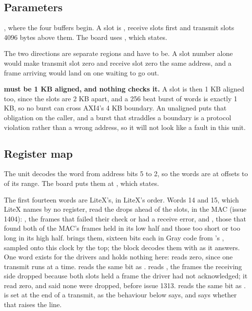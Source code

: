 \subsection*{Parameters}

, where the four buffers begin. A slot is , receive slots first and transmit slots 4096 bytes above them.
The board uses , which 
states.

The two directions are separate regions and have to be. A slot number
alone would make transmit slot zero and receive slot zero the same
address, and a frame arriving would land on one waiting to go out.

\textbf{ must be 1 KB aligned, and nothing checks it.} A
slot is then 1 KB aligned too, since the slots are 2 KB apart, and a
256 beat burst of words is exactly 1 KB, so no burst can cross AXI4's
4 KB boundary. An unaligned  puts that obligation on the
caller, and a burst that straddles a boundary is a protocol violation
rather than a wrong address, so it will not look like a fault in this
unit.

\subsection*{Register map}

The unit decodes the word from address bits 5 to 2, so the words are
at offsets  to  of its range. The board puts
them at , which  states.


The first fourteen words are LiteX's, in LiteX's order. Words 14 and
15, which LiteX names by no register, read the drops ahead of the
slots, in the MAC (issue 1404): , the frames that
failed their check or had a receive error, and ,
those that found both of the MAC's frames held in its low half and
those too short or too long in its high half.  brings
them, sixteen bits each in Gray code from 's
, sampled onto this clock by the top; the block decodes
them with  as it answers. One word exists for the drivers and
holds nothing here:  reads zero, since one transmit
runs at a time.  reads the same bit as
.  reads ,
the frames the receiving side dropped because both slots held a frame
the driver had not acknowledged; it read zero, and said none were
dropped, before issue 1313.  reads the same bit as
.  is set at the end of
a transmit, as the behaviour below says, and 
says whether that raises the line.

